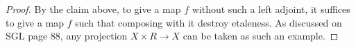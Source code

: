 \documentclass[a4paper]{article}
\DeclareMathOperator{\Hom}{\text {Hom}}
\DeclareMathOperator{\Et}{\text {Etale}}
\begin{document}
\begin{proof}
    By the claim above, to give a map $f$ without such a left adjoint, it suffices to give a map $f$ such that composing with it destroy etaleness. As discussed on SGL page 88,  any projection $X\times R\to X$ can be taken as such an example.


\end{proof}
\end{document}
